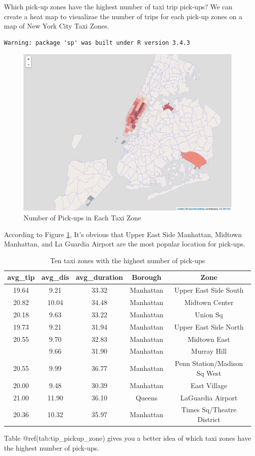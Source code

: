 \documentclass[12pt,twoside]{reedthesis}
\theoremstyle{definition}
\theoremstyle{definition}
\theoremstyle{definition}
\theoremstyle{remark}
\begin{document}
Which pick-up zones have the highest number of taxi trip pick-ups? We
can create a heat map to visualizae the number of trips for each pick-up
zones on a map of New York City Taxi Zones.
\begin{verbatim}
Warning: package 'sp' was built under R version 3.4.3
\end{verbatim}
\begin{figure}

{\centering \includegraphics[width=4.96in]{figure/num_trip} 

}

\caption{Number of Pick-ups in Each Taxi Zone}\label{fig:num-trip}
\end{figure}
According to Figure \ref{fig:num-trip}, It's obvious that Upper East
Side Manhattan, Midtown Manhattan, and La Guardia Airport are the most
popular location for pick-ups.
\begin{table}

\caption{\label{tab:unnamed-chunk-46}Ten taxi zones with the highest number of pick-ups}
\centering
\begin{tabular}[t]{ccccc}
\toprule
avg\_tip & avg\_dis & avg\_duration & Borough & Zone\\
\midrule
19.64 & 9.21 & 33.32 & Manhattan & Upper East Side South\\
20.82 & 10.04 & 34.48 & Manhattan & Midtown Center\\
20.18 & 9.63 & 33.22 & Manhattan & Union Sq\\
19.73 & 9.21 & 31.94 & Manhattan & Upper East Side North\\
20.55 & 9.70 & 32.83 & Manhattan & Midtown East\\
\addlinespace
20.55 & 9.66 & 31.90 & Manhattan & Murray Hill\\
20.55 & 9.99 & 36.77 & Manhattan & Penn Station/Madison Sq West\\
20.00 & 9.48 & 30.39 & Manhattan & East Village\\
21.00 & 11.90 & 36.10 & Queens & LaGuardia Airport\\
20.36 & 10.32 & 35.97 & Manhattan & Times Sq/Theatre District\\
\bottomrule
\end{tabular}
\end{table}
Table @ref(tab:tip\_pickup\_zone) gives you a better idea of which taxi
zones have the highest number of pick-ups.
\end{document}
